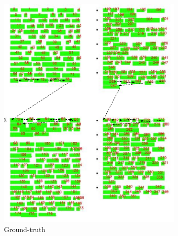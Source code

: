 \begin{figure}
  \centering
  \small
      \begin{subfigure}[b]{0.4\textwidth}
        \includegraphics[width=\textwidth]{images/chapter4/gold_multicolumn_with_ro.pdf}
        \caption{Ground-truth}
      \end{subfigure}
      \begin{subfigure}[b]{0.4\textwidth}

\end{subfigure}
\end{figure}
